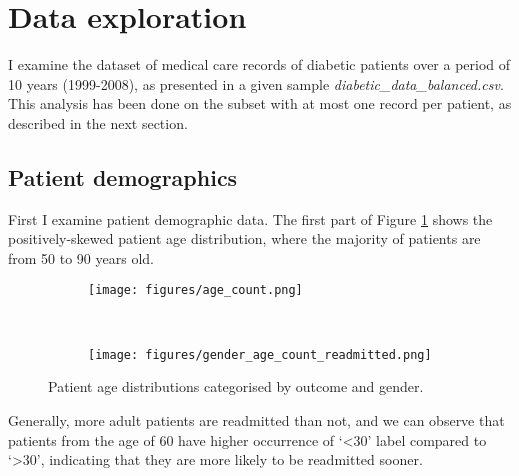 \documentclass[10pt, twocolumn]{article}
\begin{document}
\thispagestyle{first}
\pagestyle{plain}


\section{Data exploration}

I examine the dataset of medical care records of diabetic patients over a period of 10 years (1999-2008), as presented in a given sample \textit{diabetic\_data\_balanced.csv}. This analysis has been done on the subset with at most one record per patient, as described in the next section.

\subsection{Patient demographics}

First I examine patient demographic data. The first part of Figure \ref{genderagecountreadmitted} shows the positively-skewed patient age distribution, where the majority of patients are from 50 to 90 years old.

\begin{figure}[htb!]
	\centering
	\begin{subfigure}[t]{0.5\textwidth}
        \centering
        \texttt{[image: figures/age\_count.png]}
	\end{subfigure}
	~
	\begin{subfigure}[t]{0.5\textwidth}
        \centering
		\texttt{[image: figures/gender\_age\_count\_readmitted.png]}
    \end{subfigure}
	\caption{Patient age distributions categorised by outcome and gender.}\label{genderagecountreadmitted}
\end{figure}
Generally, more adult patients are readmitted than not, and we can observe that patients from the age of 60 have higher occurrence of `<30' label compared to `>30', indicating that they are more likely to be readmitted sooner.
\end{document}
